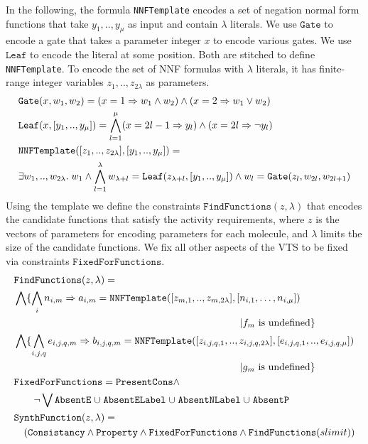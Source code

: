 In the following, the formula \texttt{NNFTemplate} encodes a set of
negation normal form functions that take $y_1,..,y_\mu$ as input and
contain $\lambda$ literals.
%
We use $\texttt{Gate}$ to encode a gate that takes a parameter integer
$x$ to encode various gates.
%
We use $\texttt{Leaf} $ to encode the literal at some position.
%
Both are stitched to define \texttt{NNFTemplate}.
%
To encode the set of NNF formulas with $\lambda$ literals, it has
finite-range integer variables
$z_1,..,z_{2\lambda}$ as parameters.
%
\begin{align*}
&\texttt{Gate}( x, w_1, w_2 ) = ( x  = 1 \Rightarrow w_1  \land w_2 ) \land  
( x = 2  \Rightarrow w_1  \lor w_2 ) \\
&\texttt{Leaf}( x, [y_1,..,y_\mu] ) =
\bigwedge\limits_{l=1}^{\mu} ( x = 2l-1  \Rightarrow y_{l}) \land ( x = 2l  \Rightarrow \lnot y_{l})\\
&\texttt{NNFTemplate}([z_1,..,z_{2\lambda}],[y_1,..,y_\mu] ) = \\
&\exists w_1,..,w_{2\lambda}.\;w_1 \land \bigwedge_{l=1}^{\lambda} w_{\lambda+l} = \texttt{Leaf}( z_{\lambda+l}, [y_1,..,y_\mu] ) \land
w_{l} = \texttt{Gate}( z_l, w_{2l},w_{2l+1})
\end{align*}
%
Using the template we define the constraints $\texttt{FindFunctions}(z,\lambda)$
that encodes the candidate functions that satisfy the activity requirements,
where $z$ is the vectors of parameters for encoding parameters
for each molecule,
and $\lambda$ limits the size of the candidate functions. 
%
We fix all other aspects of the VTS to be fixed via constraints
$\texttt{FixedForFunctions}$.
%
\begin{align*}
&\texttt{FindFunctions}(z,\lambda) =\\
&\Land \{ \bigwedge\limits_{i} n_{i,m} \limplies a_{i,m} = 
\texttt{NNFTemplate}([z_{m,1},..,z_{m,2\lambda}],[n_{i,1},\dots,n_{i,\mu}] ) \\
& \hspace{8cm}|
\nodef_m \text{ is undefined}\} \\
&\Land \{ \bigwedge\limits_{i,j,q} e_{i,j,q,m} \limplies b_{i,j,q,m} = 
\texttt{NNFTemplate}([z_{i,j,q,1},..,z_{i,j,q,2\lambda}],[e_{i,j,q,1},..,e_{i,j,q,\mu}] ) \\
& \hspace{8cm} | \edgef_m \text{ is undefined}
\}\\
& \texttt{FixedForFunctions} = \texttt{PresentCons} \land\\
& \quad \quad
\lnot \Lor \texttt{AbsentE} \;\union\; \texttt{AbsentELabel} \;\union\;
\texttt{AbsentNLabel} \;\union\;
\texttt{AbsentP}\\
&\texttt{SynthFunction}(z,\lambda) = \\
& \quad
(  \texttt{Consistancy}\land \texttt{Property} \land
\texttt{FixedForFunctions} \land \texttt{FindFunctions}(slimit) )
\end{align*}

